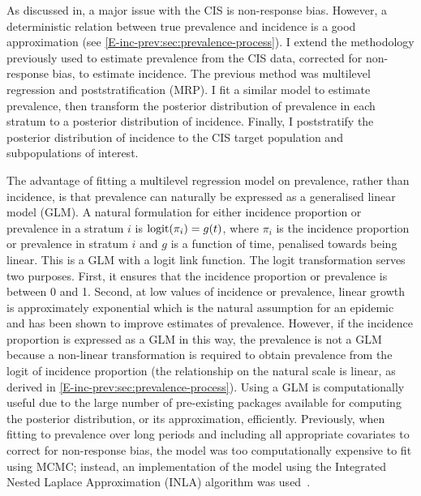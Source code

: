 \documentclass[thesis.tex]{subfiles}
\begin{document}
As discussed in, a major issue with the CIS is non-response bias.
However, a deterministic relation between true prevalence and incidence is a good approximation (see \cref{E-inc-prev:sec:prevalence-process}).
I extend the methodology previously used to estimate prevalence from the CIS data, corrected for non-response bias, to estimate incidence.
The previous method was multilevel regression and poststratification (MRP).
I fit a similar model to estimate prevalence, then transform the posterior distribution of prevalence in each stratum to a posterior distribution of incidence.
Finally, I poststratify the posterior distribution of incidence to the CIS target population and subpopulations of interest.

The advantage of fitting a multilevel regression model on prevalence, rather than incidence, is that prevalence can naturally be expressed as a generalised linear model (GLM).
A natural formulation for either incidence proportion or prevalence in a stratum $i$ is $\operatorname{logit}(\pi_i) = g(t)$, where $\pi_i$ is the incidence proportion or prevalence in stratum $i$ and $g$ is a function of time, penalised towards being linear.
This is a GLM with a logit link function.
The logit transformation serves two purposes.
First, it ensures that the incidence proportion or prevalence is between 0 and 1.
Second, at low values of incidence or prevalence, linear growth is approximately exponential which is the natural assumption for an epidemic and has been shown to improve estimates of prevalence.
However, if the incidence proportion is expressed as a GLM in this way, the prevalence is not a GLM because a non-linear transformation is required to obtain prevalence from the logit of incidence proportion (the relationship on the natural scale is linear, as derived in \cref{E-inc-prev:sec:prevalence-process}).
Using a GLM is computationally useful due to the large number of pre-existing packages available for computing the posterior distribution, or its approximation, efficiently.
Previously, when fitting to prevalence over long periods and including all appropriate covariates to correct for non-response bias, the model was too computationally expensive to fit using MCMC; instead, an implementation of the model using the Integrated Nested Laplace Approximation (INLA) algorithm was used~.
\end{document}
